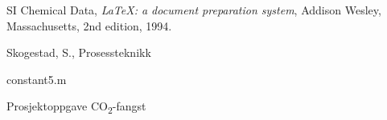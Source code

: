 \begin{thebibliography}{9}

SI Chemical Data,
  \emph{\LaTeX: a document preparation system},
  Addison Wesley, Massachusetts,
  2nd edition,
  1994.
  
Skogestad, S., Prosessteknikk

constant5.m

Prosjektoppgave CO\textsubscript{2}-fangst


\end{thebibliography}

